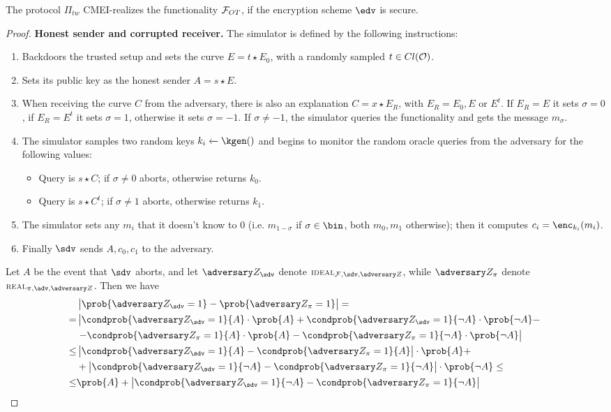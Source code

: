 \begin{theorem}
    The protocol $\Pi_{tw}$ CMEI-realizes the functionality $\mathcal{F}_{OT}$, if the encryption scheme $\edv$ is \indcpa secure.
\end{theorem}
\begin{proof}
    \textbf{Honest sender and corrupted receiver.} The simulator is defined by the following instructions:
    \begin{enumerate}
        \item Backdoors the trusted setup and sets the curve $E=t\star E_0$, with a randomly sampled $t\in Cl(\mathcal{O})$.
        \item Sets its public key as the honest sender $A=s\star E$.
        \item When receiving the curve $C$ from the adversary, there is also an explanation $C=x\star E_R$, with $E_R=E_0,E$ or $E^t$. If $E_R=E$ it sets $\sigma=0$, if $E_R=E^t$ it sets $\sigma=1$, otherwise it sets $\sigma=-1$. If $\sigma\neq -1$, the simulator queries the functionality and gets the message $m_\sigma$.
        \item The simulator samples two random keys $k_i\xleftarrow{}\kgen()$ and begins to monitor the random oracle queries from the adversary for the following values:
        \begin{itemize}
            \item Query is $s\star C$; if $\sigma\neq0$ aborts, otherwise returns $k_0$.
            \item Query is $s\star C^t$; if $\sigma\neq1$ aborts, otherwise returns $k_1$.
        \end{itemize}
        \item The simulator sets any $m_i$ that it doesn't know to $0$ (i.e. $m_{1-\sigma}$ if $\sigma\in\bin$, both $m_0,m_1$ otherwise); then it computes $c_i=\enc_{k_i}(m_i)$.
        \item Finally $\sdv$ sends $A,c_0,c_1$ to the adversary.
    \end{enumerate}
    
    Let $A$ be the event that $\sdv$ aborts, and let $\zdv_\sdv$ denote $\textsc{\scriptsize IDEAL}_{\Fun,\sdv,\zdv}$, while $\zdv_\pi$ denote $\textsc{\scriptsize REAL}_{\pi,\adv,\zdv}$. Then we have
    \begin{align*}
         & \left|\prob{\zdv_\sdv=1}-\prob{\zdv_\pi=1}\right| =\\
        = & \left|\condprob{\zdv_\sdv=1}{A}\cdot\prob{A} + \condprob{\zdv_\sdv=1}{\neg A}\cdot\prob{\neg A} -\right.\\
        & \left.- \condprob{\zdv_\pi=1}{A}\cdot\prob{A} - \condprob{\zdv_\pi=1}{\neg A}\cdot\prob{\neg A}\right| \\
        \le & \left| \condprob{\zdv_\sdv=1}{A} - \condprob{\zdv_\pi=1}{A}\right|\cdot\prob{A}  +\\
         &+ \left| \condprob{\zdv_\sdv=1}{\neg A} - \condprob{\zdv_\pi=1}{\neg A}\right|\cdot\prob{\neg A} \le \\
        \le & \prob{A} + \left| \condprob{\zdv_\sdv=1}{\neg A} - \condprob{\zdv_\pi=1}{\neg A}\right|
    \end{align*}


\end{proof}
